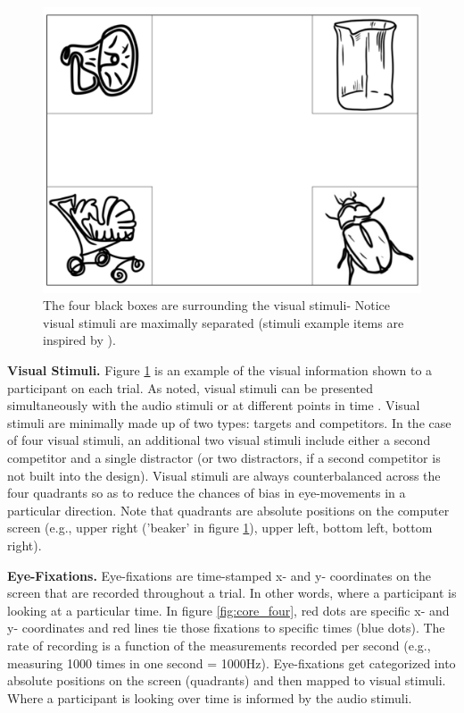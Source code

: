 \begin{figure}[h]
    \centering
    \includegraphics[scale=.35]{figures/Visual_stimuli.png}
    \caption{The four black boxes are surrounding the visual stimuli- Notice visual stimuli are maximally separated (stimuli example items are inspired by \textcite[][]{Allopenna_1998}{}{}). }
    \label{fig:Visual_stimuli.png}
\end{figure}

\textbf{Visual Stimuli.} Figure \ref{fig:Visual_stimuli.png} is an example of the visual information shown to a participant on each trial. As noted, visual stimuli can be presented simultaneously with the audio stimuli or at different points in time  \parencite{Apfelbaum_Klein-Packard_McMurray_2021}. Visual stimuli are minimally made up of two types: targets and competitors. In the case of four visual stimuli, an additional two visual stimuli include either a second competitor and a single distractor (or two distractors, if a second competitor is not built into the design). Visual stimuli are always counterbalanced across the four quadrants so as to reduce the chances of bias in eye-movements in a particular direction. Note that quadrants are absolute positions on the computer screen (e.g., upper right ('beaker' in figure \ref{fig:Visual_stimuli.png}), upper left, bottom left, bottom right). 

\textbf{Eye-Fixations.} Eye-fixations are time-stamped x- and y- coordinates on the screen that are recorded throughout a trial. In other words, where a participant is looking at a particular time. In figure \ref{fig:core_four}, red dots are specific x- and y- coordinates and red lines tie those fixations to specific times (blue dots). The rate of recording is a function of the measurements recorded per second (e.g., measuring 1000 times in one second = 1000Hz). Eye-fixations get categorized into absolute positions on the screen (quadrants) and then mapped to visual stimuli. Where a participant is looking over time is informed by the audio stimuli.

